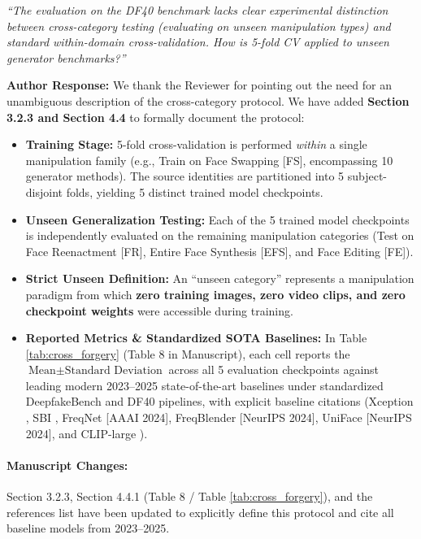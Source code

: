 \documentclass[runningheads]{llncs}
\begin{document}
\begin{tcolorbox}[colback=gray!10,colframe=gray!50,title=\textbf{Reviewer Comment 4}]
\textit{``The evaluation on the DF40 benchmark lacks clear experimental distinction between cross-category testing (evaluating on unseen manipulation types) and standard within-domain cross-validation. How is 5-fold CV applied to unseen generator benchmarks?''}
\end{tcolorbox}

\noindent\textbf{Author Response:} We thank the Reviewer for pointing out the need for an unambiguous description of the cross-category protocol. We have added \textbf{Section 3.2.3 and Section 4.4} to formally document the protocol:

\begin{itemize}
    \item \textbf{Training Stage:} 5-fold cross-validation is performed \textit{within} a single manipulation family (e.g., Train on Face Swapping [FS], encompassing 10 generator methods). The source identities are partitioned into 5 subject-disjoint folds, yielding 5 distinct trained model checkpoints.
    \item \textbf{Unseen Generalization Testing:} Each of the 5 trained model checkpoints is independently evaluated on the remaining manipulation categories (Test on Face Reenactment [FR], Entire Face Synthesis [EFS], and Face Editing [FE]).
    \item \textbf{Strict Unseen Definition:} An ``unseen category'' represents a manipulation paradigm from which \textbf{zero training images, zero video clips, and zero checkpoint weights} were accessible during training.
    \item \textbf{Reported Metrics \& Standardized SOTA Baselines:} In Table \ref{tab:cross_forgery} (Table 8 in Manuscript), each cell reports the $\text{Mean} \pm \text{Standard Deviation}$ across all 5 evaluation checkpoints against leading modern 2023--2025 state-of-the-art baselines under standardized DeepfakeBench \citep{Yan2023DeepfakeBench} and DF40 \citep{Yan2024DF40} pipelines, with explicit baseline citations (Xception \citep{Chollet2017CVPR, Yan2023DeepfakeBench}, SBI \citep{Shiohara2022SBI, Yan2024DF40}, FreqNet \citep{Chen2024FreqNet} [AAAI 2024], FreqBlender \citep{Huang2024FreqBlender} [NeurIPS 2024], UniFace \citep{Yan2024DF40} [NeurIPS 2024], and CLIP-large \citep{Radford2021CLIP, Yan2024DF40}).
\end{itemize}

\paragraph{Manuscript Changes:} Section 3.2.3, Section 4.4.1 (Table 8 / Table \ref{tab:cross_forgery}), and the references list have been updated to explicitly define this protocol and cite all baseline models from 2023--2025.
\end{document}
